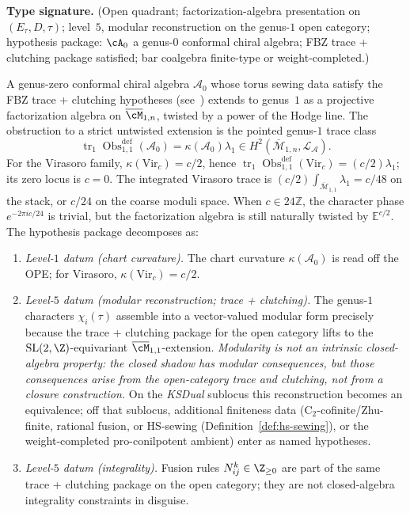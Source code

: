 \begin{theorem}\label{thm:extension-obstruction}
\textbf{Type signature.} (Open quadrant; factorization-algebra
presentation on $(E_\tau, D, \tau)$; level~$5$, modular reconstruction
on the genus-$1$ open category; hypothesis package: $\cA_0$ a
genus-$0$ conformal chiral algebra; FBZ trace + clutching package
satisfied; bar coalgebra finite-type or weight-completed.)

A genus-zero conformal chiral algebra $\mathcal{A}_0$ whose torus
sewing data satisfy the FBZ trace + clutching hypotheses
\textup{(}see~\cite{FBZ04}\textup{)} extends to genus~$1$ as a projective
factorization algebra on $\overline{\cM}_{1,n}$, twisted by a power of
the Hodge line. The obstruction to a strict untwisted extension is
the pointed genus-$1$ trace class
\[
\operatorname{tr}_1\operatorname{Obs}^{\mathrm{def}}_{1,1}(\mathcal{A}_0)
=\kappa(\mathcal{A}_0)\lambda_1
\in H^2(\overline{\mathcal{M}}_{1,n},\mathcal{L}_{\mathcal{A}}).
\]
For the Virasoro family, $\kappa(\mathrm{Vir}_c)=c/2$, hence
$\operatorname{tr}_1\operatorname{Obs}^{\mathrm{def}}_{1,1}(\mathrm{Vir}_c)
=(c/2)\lambda_1$; its zero locus is $c=0$. The integrated Virasoro
trace is
$(c/2)\int_{\overline{\mathcal{M}}_{1,1}}\lambda_1=c/48$ on the
stack, or $c/24$ on the coarse moduli space. When
$c\in24\mathbb Z$, the character phase $e^{-2\pi i c/24}$ is
trivial, but the factorization algebra is still naturally twisted by
$\mathbb{E}^{c/2}$. The hypothesis package decomposes as:
\begin{enumerate}
\item \emph{Level-$1$ datum (chart curvature).} The chart curvature
$\kappa(\mathcal{A}_0)$ is read off the OPE; for Virasoro,
$\kappa(\mathrm{Vir}_c)=c/2$.
\item \emph{Level-$5$ datum (modular reconstruction; trace + clutching).}
The genus-$1$ characters $\chi_i(\tau)$ assemble into a vector-valued
modular form precisely because the trace + clutching package for the
open category lifts to the $\mathrm{SL}(2,\Z)$-equivariant
$\overline{\cM}_{1,1}$-extension. \emph{Modularity is not an intrinsic
closed-algebra property: the closed shadow has modular consequences,
but those consequences arise from the open-category trace and
clutching, not from a closure construction.} On the \emph{KSDual}
sublocus this reconstruction becomes an equivalence; off that
sublocus, additional finiteness data
\textup{(}\textsc{C}$_2$-cofinite/Zhu-finite, rational fusion, or HS-sewing
\textup{(}Definition~\ref{def:hs-sewing}\textup{)}, or the
weight-completed pro-conilpotent ambient\textup{)} enter as named hypotheses.
\item \emph{Level-$5$ datum (integrality).} Fusion rules
$N_{ij}^k \in \Z_{\ge 0}$ are part of the same trace + clutching
package on the open category; they are not closed-algebra integrality
constraints in disguise.
\end{enumerate}


\end{theorem}
